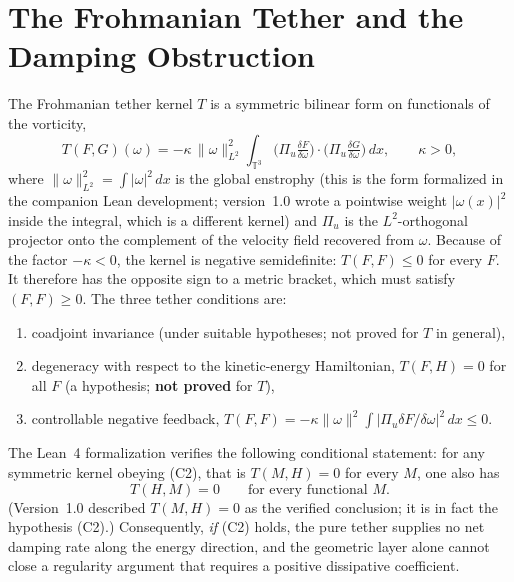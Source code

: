 \documentclass[11pt,a4paper]{article}
\begin{document}
\section{The Frohmanian Tether and the Damping Obstruction}
The Frohmanian tether kernel \(T\) is a symmetric bilinear form on functionals of the vorticity,
\begin{equation}
T(F,G)(\omega) = -\kappa\,\|\omega\|_{L^2}^2\int_{\mathbb{T}^3}
\bigl(\Pi_u\tfrac{\delta F}{\delta\omega}\bigr)\cdot
\bigl(\Pi_u\tfrac{\delta G}{\delta\omega}\bigr)\,dx,\qquad \kappa>0,
\end{equation}
where \(\|\omega\|_{L^2}^2=\int|\omega|^2\,dx\) is the global enstrophy (this is the form formalized in the companion Lean development; version~1.0 wrote a pointwise weight \(|\omega(x)|^2\) inside the integral, which is a different kernel) and \(\Pi_u\) is the \(L^2\)-orthogonal projector onto the complement of the velocity field recovered from \(\omega\). Because of the factor \(-\kappa<0\), the kernel is negative semidefinite: \(T(F,F)\le0\) for every \(F\). It therefore has the opposite sign to a metric bracket, which must satisfy \((F,F)\ge0\). The three tether conditions are:
\begin{enumerate}[label=(C\arabic*)]
\item coadjoint invariance (under suitable hypotheses; not proved for \(T\) in general),
\item degeneracy with respect to the kinetic-energy Hamiltonian, \(T(F,H)=0\) for all \(F\) (a hypothesis; \textbf{not proved} for \(T\)),
\item controllable negative feedback, \(T(F,F)=-\kappa\|\omega\|^2\int|\Pi_u\delta F/\delta\omega|^2\,dx\le0\).
\end{enumerate}
The Lean~4 formalization verifies the following conditional statement: for any symmetric kernel obeying (C2), that is \(T(M,H)=0\) for every \(M\), one also has
\begin{equation}
T(H,M)=0\qquad\text{for every functional }M.
\end{equation}
(Version~1.0 described \(T(M,H)=0\) as the verified conclusion; it is in fact the hypothesis (C2).) Consequently, \emph{if} (C2) holds, the pure tether supplies no net damping rate along the energy direction, and the geometric layer alone cannot close a regularity argument that requires a positive dissipative coefficient.
\end{document}
